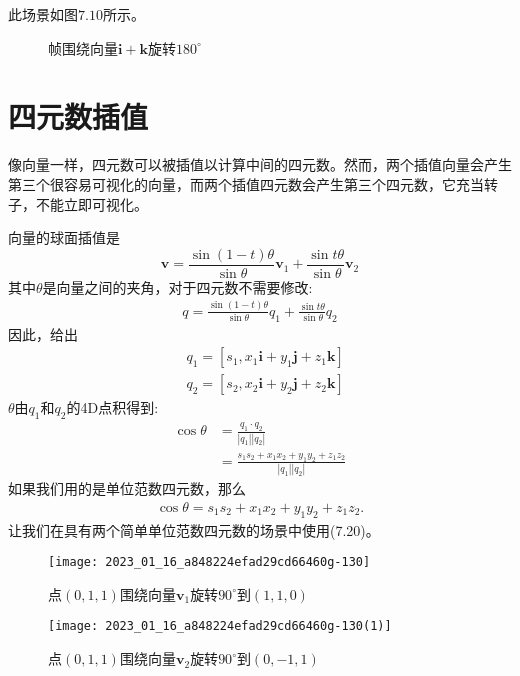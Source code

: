此场景如图$7.10$所示。
\begin{figure}[h!]
    \centering
    \caption[short]{帧围绕向量$\mathbf{i}+\mathbf{k}$旋转$180^{\circ}$}
\end{figure}

\section{四元数插值}
像向量一样，四元数可以被插值以计算中间的四元数。然而，两个插值向量会产生第三个很容易可视化的向量，而两个插值四元数会产生第三个四元数，它充当转子，不能立即可视化。

向量的球面插值是
$$
\mathbf{v}=\frac{\sin (1-t) \theta}{\sin \theta} \mathbf{v}_{1}+\frac{\sin t \theta}{\sin \theta} \mathbf{v}_{2}
$$
其中$\theta$是向量之间的夹角，对于四元数不需要修改:
\begin{align}
q=\frac{\sin (1-t) \theta}{\sin \theta} q_{1}+\frac{\sin t \theta}{\sin \theta} q_{2}
\end{align}
因此，给出
$$
\begin{aligned}
& q_{1}=\left[s_{1}, x_{1} \mathbf{i}+y_{1} \mathbf{j}+z_{1} \mathbf{k}\right] \\
& q_{2}=\left[s_{2}, x_{2} \mathbf{i}+y_{2} \mathbf{j}+z_{2} \mathbf{k}\right]
\end{aligned}
$$
$\theta$由$q_{1}$和$q_{2}$的4D点积得到:
$$
\begin{aligned}
\cos \theta & =\frac{q_{1} \cdot q_{2}}{\left|q_{1}\right|\left|q_{2}\right|} \\
& =\frac{s_{1} s_{2}+x_{1} x_{2}+y_{1} y_{2}+z_{1} z_{2}}{\left|q_{1}\right|\left|q_{2}\right|}
\end{aligned}
$$
如果我们用的是单位范数四元数，那么
\begin{align}
    \cos \theta=s_{1} s_{2}+x_{1} x_{2}+y_{1} y_{2}+z_{1} z_{2} .
\end{align}
让我们在具有两个简单单位范数四元数的场景中使用(7.20)。

\begin{figure}[h!]
    \centering
    \texttt{[image: 2023\_01\_16\_a848224efad29cd66460g-130]}
    \caption[short]{点$(0,1,1)$围绕向量$\mathbf{v}_{1}$旋转$90^{\circ}$到$(1,1,0)$}
\end{figure}

\begin{figure}[h!]
    \centering
    \texttt{[image: 2023\_01\_16\_a848224efad29cd66460g-130(1)]}
    \caption[short]{点$(0,1,1)$围绕向量$\mathbf{v}_{2}$旋转$90^{\circ}$到$(0,-1,1)$}
\end{figure}

